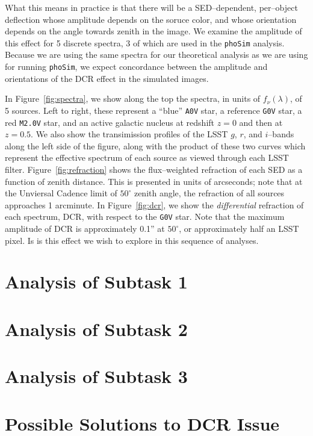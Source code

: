 \documentclass[prd, nofootinbib, floatfix, 11pt, tightenlines, times]{article}
\begin{document}
What this means in practice is that there will be a SED--dependent,
per--object deflection whose amplitude depends on the soruce color,
and whose orientation depends on the angle towards zenith in the
image.  We examine the amplitude of this effect for 5 discrete
spectra, 3 of which are used in the {\tt phoSim} analysis.  Because we
are using the same spectra for our theoretical analysis as we are
using for running {\tt phoSim}, we expect concordance between the
amplitude and orientations of the DCR effect in the simulated images.

In Figure~\ref{fig:spectra}, we show along the top the spectra, in
units of $f_\nu(\lambda)$, of 5 sources.  Left to right, these
represent a ``blue'' {\tt A0V} star, a reference {\tt G0V} star, a red
{\tt M2.0V} star, and an active galactic nucleus at redshift $z=0$ and
then at $z=0.5$.  We also show the transimission profiles of the LSST
$g$, $r$, and $i$--bands along the left side of the figure, along with
the product of these two curves which represent the effective spectrum
of each source as viewed through each LSST filter.
Figure~\ref{fig:refraction} shows the flux--weighted refraction of
each SED as a function of zenith distance.  This is presented in units
of arcseconds; note that at the Unviersal Cadence limit of
$50^{\circ}$ zenith angle, the refraction of all sources approaches 1
arcminute.  In Figure~\ref{fig:dcr}, we show the {\it differential}
refraction of each spectrum, DCR, with respect to the {\tt G0V} star.
Note that the maximum amplitude of DCR is approximately 0.1'' at
$50^{\circ}$, or approximately half an LSST pixel.  Is is this effect
we wish to explore in this sequence of analyses.  

\section{Analysis of Subtask 1 \label{sec:task1}}

\section{Analysis of Subtask 2 \label{sec:task2}}

\section{Analysis of Subtask 3 \label{sec:task3}}

\section{Possible Solutions to DCR Issue}
\end{document}
